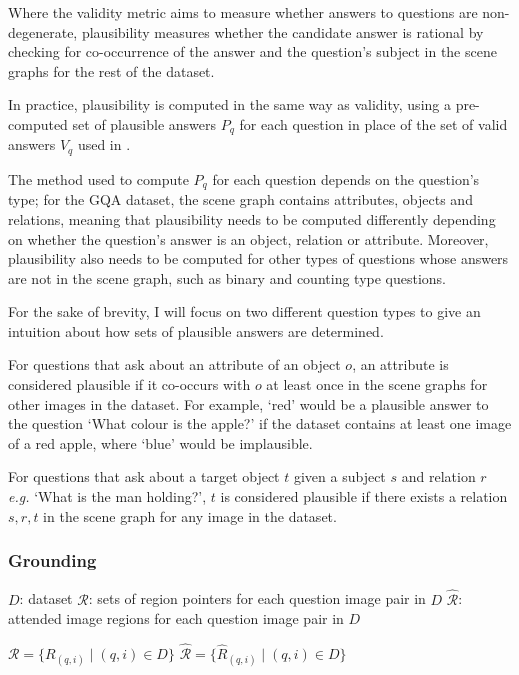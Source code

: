 Where the validity metric aims to measure whether answers to questions are non-degenerate, plausibility measures whether the candidate answer is rational by checking for co-occurrence of the answer and the question's subject in the scene graphs for the rest of the dataset.

In practice, plausibility is computed in the same way as validity, using a pre-computed set of plausible answers \(P_q\)  for each question in place of the set of valid answers \(V_q\) used in \equationautorefname{ \ref{equation:validity}}.

The method used to compute \(P_q\) for each question depends on the question's type; for the GQA dataset, the scene graph contains attributes, objects and relations, meaning that plausibility needs to be computed differently depending on whether the question's answer is an object, relation or attribute. Moreover, plausibility also needs to be computed for other types of questions whose answers are not in the scene graph, such as binary and counting type questions.

For the sake of brevity, I will focus on two different question types to give an intuition about how sets of plausible answers are determined.

For questions that ask about an attribute of an object \(o\), an attribute is considered plausible if it co-occurs with \(o\) at least once in the scene graphs for other images in the dataset. For example, `red' would be a plausible answer to the question `What colour is the apple?' if the dataset contains at least one image of a red apple, where `blue' would be implausible.

For questions that ask about a target object \(t\) given a subject \(s\) and relation \(r\) \textit{e.g.} `What is the man holding?', \(t\) is considered plausible if there exists a relation \(s, r, t\) in the scene graph for any image in the dataset. 

\subsubsection{Grounding}

\(D\): dataset
\(\mathcal{R}\): sets of region pointers for each question image pair in \(D\)
\(\hat{\mathcal{R}}\): attended image regions for each question image pair in \(D\)

\(\mathcal{R} = \{R_{(q,i)} \mid (q,i) \in D\}\)
\(\hat{\mathcal{R}} = \{\hat{R}_{(q,i)} \mid (q,i) \in D\}\)

